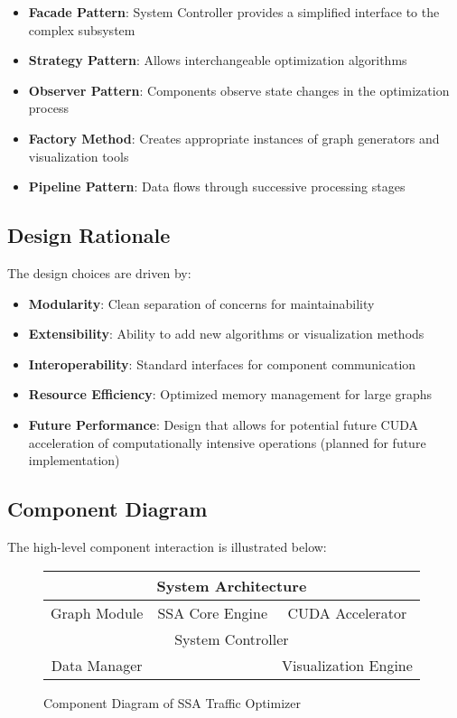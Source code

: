 \documentclass[conference]{IEEEtran}
\begin{document}
\begin{itemize}
    \item \textbf{Facade Pattern}: System Controller provides a simplified interface to the complex subsystem
    \item \textbf{Strategy Pattern}: Allows interchangeable optimization algorithms
    \item \textbf{Observer Pattern}: Components observe state changes in the optimization process
    \item \textbf{Factory Method}: Creates appropriate instances of graph generators and visualization tools
    \item \textbf{Pipeline Pattern}: Data flows through successive processing stages
\end{itemize}

\subsection{Design Rationale}
The design choices are driven by:

\begin{itemize}
    \item \textbf{Modularity}: Clean separation of concerns for maintainability
    \item \textbf{Extensibility}: Ability to add new algorithms or visualization methods
    \item \textbf{Interoperability}: Standard interfaces for component communication
    \item \textbf{Resource Efficiency}: Optimized memory management for large graphs
    \item \textbf{Future Performance}: Design that allows for potential future CUDA acceleration of computationally intensive operations (planned for future implementation)
\end{itemize}

\subsection{Component Diagram}

The high-level component interaction is illustrated below:

\begin{figure}[h]
\centering
\begin{tabular}{|c|c|c|}
\hline
\multicolumn{3}{|c|}{System Architecture} \\
\hline
Graph Module & SSA Core Engine & CUDA Accelerator \\
\hline
\multicolumn{3}{|c|}{System Controller} \\
\hline
Data Manager & & Visualization Engine \\
\hline
\end{tabular}
\caption{Component Diagram of SSA Traffic Optimizer}
\end{figure}
\end{document}
